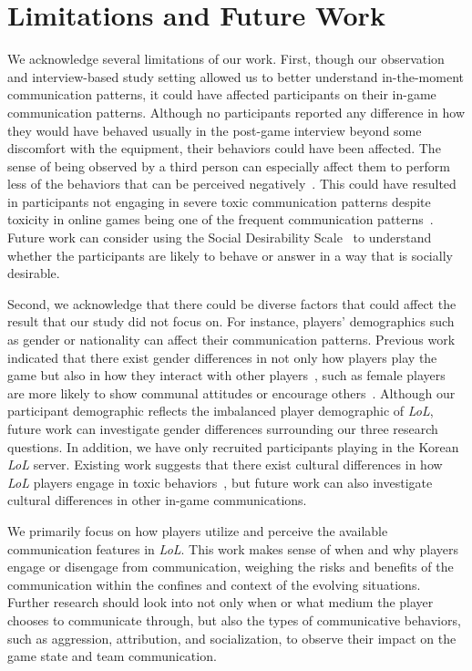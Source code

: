 \section{Limitations and Future Work} \label{limitations}

We acknowledge several limitations of our work. First, though our observation and interview-based study setting allowed us to better understand in-the-moment communication patterns, it could have affected participants on their in-game communication patterns. Although no participants reported any difference in how they would have behaved usually in the post-game interview beyond some discomfort with the equipment, their behaviors could have been affected. The sense of being observed by a third person can especially affect them to perform less of the behaviors that can be perceived negatively~\cite{kim2020understanding}. This could have resulted in participants not engaging in severe toxic communication patterns despite toxicity in online games being one of the frequent communication patterns~\cite{kou2020toxic, beres2021, nexo2023players}. Future work can consider using the Social Desirability Scale~\cite{mccrae1983social} to understand whether the participants are likely to behave or answer in a way that is socially desirable.

Second, we acknowledge that there could be diverse factors that could affect the result that our study did not focus on. For instance, players' demographics such as gender or nationality can affect their communication patterns. Previous work indicated that there exist gender differences in not only how players play the game but also in how they interact with other players~\cite{veltri2014gender}, such as female players are more likely to show communal attitudes or encourage others~\cite{hong2012gender}. Although our participant demographic reflects the imbalanced player demographic of \textit{LoL}, future work can investigate gender differences surrounding our three research questions. In addition, we have only recruited participants playing in the Korean \textit{LoL} server. Existing work suggests that there exist cultural differences in how \textit{LoL} players engage in toxic behaviors~\cite{sengun2019exploring}, but future work can also investigate cultural differences in other in-game communications.

We primarily focus on how players utilize and perceive the available communication features in \textit{LoL}. This work makes sense of when and why players engage or disengage from communication, weighing the risks and benefits of the communication within the confines and context of the evolving situations. Further research should look into not only when or what medium the player chooses to communicate through, but also the types of communicative behaviors, such as aggression, attribution, and socialization, to observe their impact on the game state and team communication.
